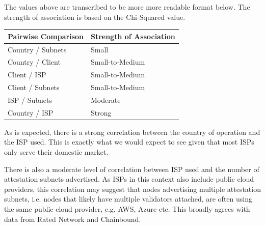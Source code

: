 \documentclass[conference]{IEEEtran}
\begin{document}
The values above are transcribed to be more more readable format below.  The strength of association is based on the Chi-Squared value.

\begin{table}[htbp]
    \centering
    \normalsize
    \begin{tabular}{p{4cm}p{4cm}}
        \toprule
        Pairwise Comparison & Strength of Association \\
        \midrule
        Country / Subnets & Small \\
        Country / Client & Small-to-Medium \\
        Client / ISP & Small-to-Medium \\
        Client / Subnets & Small-to-Medium \\
        ISP / Subnets & Moderate \\
        Country / ISP & Strong \\
        \bottomrule
    \end{tabular}
\end{table}

As is expected, there is a strong correlation between the country of operation and the ISP used.  This is exactly what we would expect to see given that most ISPs only serve their domestic market.

There is also a moderate level of correlation between ISP used and the number of attestation subnets advertised.  As ISPs in this context also include public cloud providers, this correlation may suggest that nodes advertising multiple attestation subnets, i.e. nodes that likely have multiple validators attached, are often using the same public cloud provider, e.g. AWS, Azure etc.  This broadly agrees with data from Rated Network and Chainbound.

\vspace{12pt}
\end{document}
